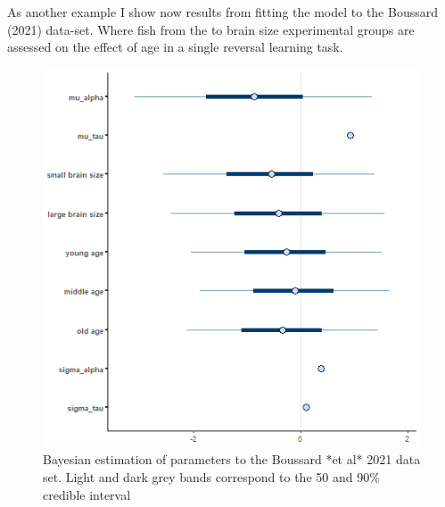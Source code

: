 \documentclass[
]{article}
\begin{document}
As another example I show now results from fitting the model to the
Boussard (2021) data-set. Where fish from the to brain size experimental
groups are assessed on the effect of age in a single reversal learning
task.

\begin{figure}

\includegraphics[width=6.67in,]{images/boussard2intervals_alpha_tau} \hfill{}

\caption{Bayesian estimation of parameters to the Boussard *et al* 2021 data set. Light and dark grey bands correspond to the 50 and 90\% credible interval}\label{fig:unnamed-chunk-18}
\end{figure}
\end{document}
